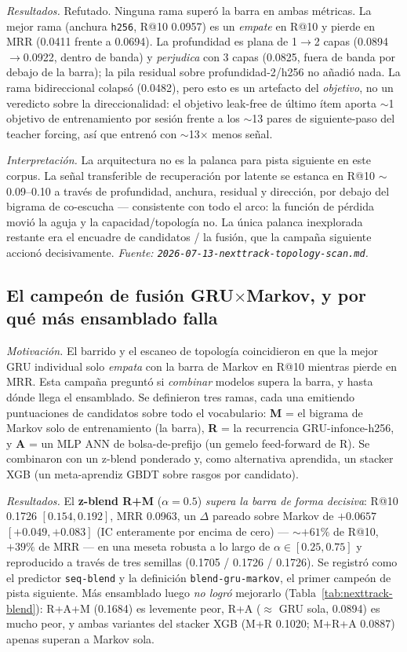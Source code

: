 \documentclass[11pt]{article}
\begin{document}
\emph{Resultados.} Refutado. Ninguna rama superó la barra en ambas métricas. La
mejor rama (anchura \texttt{h256}, R@10 \num{0.0957}) es un \emph{empate} en R@10 y
pierde en MRR (\num{0.0411} frente a \num{0.0694}). La profundidad es plana de
1$\to$2 capas (\num{0.0894}$\to$\num{0.0922}, dentro de banda) y \emph{perjudica}
con 3 capas (\num{0.0825}, fuera de banda por debajo de la barra); la pila residual
sobre profundidad-2/h256 no añadió nada. La rama bidireccional colapsó
(\num{0.0482}), pero esto es un artefacto del \emph{objetivo}, no un veredicto
sobre la direccionalidad: el objetivo leak-free de último ítem aporta $\sim$1
objetivo de entrenamiento por sesión frente a los $\sim$13 pares de siguiente-paso
del teacher forcing, así que entrenó con $\sim$13$\times$ menos señal.

\emph{Interpretación.} La arquitectura no es la palanca para pista siguiente en
este corpus. La señal transferible de recuperación por latente se estanca en R@10
$\sim$0.09--0.10 a través de profundidad, anchura, residual y dirección, por debajo
del bigrama de co-escucha --- consistente con todo el arco: la función de pérdida
movió la aguja y la capacidad/topología no. La única palanca inexplorada restante
era el encuadre de candidatos / la fusión, que la campaña siguiente accionó
decisivamente.
\emph{Fuente: \texttt{2026-07-13-nexttrack-topology-scan.md}.}

\subsection{El campeón de fusión GRU$\times$Markov, y por qué más ensamblado falla}
\label{sec:nexttrack-blend}
\emph{Motivación.} El barrido y el escaneo de topología coincidieron en que la
mejor GRU individual solo \emph{empata} con la barra de Markov en R@10 mientras
pierde en MRR. Esta campaña preguntó si \emph{combinar} modelos supera la barra, y
hasta dónde llega el ensamblado. Se definieron tres ramas, cada una emitiendo
puntuaciones de candidatos sobre todo el vocabulario: \textbf{M} = el bigrama de
Markov solo de entrenamiento (la barra), \textbf{R} = la recurrencia
GRU-infonce-h256, y \textbf{A} = un MLP ANN de bolsa-de-prefijo (un gemelo
feed-forward de R). Se combinaron con un z-blend ponderado y, como alternativa
aprendida, un stacker XGB (un meta-aprendiz GBDT sobre rasgos por candidato).

\emph{Resultados.} El \textbf{z-blend R+M} ($\alpha{=}0.5$) \emph{supera la barra
de forma decisiva}: R@10 \num{0.1726} $[0.154, 0.192]$, MRR \num{0.0963}, un
$\Delta$ pareado sobre Markov de $+\num{0.0657}$ $[+0.049, +0.083]$ (IC enteramente
por encima de cero) --- $\sim$$+61\%$ de R@10, $+39\%$ de MRR --- en una meseta
robusta a lo largo de $\alpha \in [0.25, 0.75]$ y reproducido a través de tres
semillas (\num{0.1705} / \num{0.1726} / \num{0.1726}). Se registró como el
predictor \texttt{seq-blend} y la definición \texttt{blend-gru-markov}, el primer
campeón de pista siguiente. Más ensamblado luego \emph{no logró} mejorarlo
(Tabla~\ref{tab:nexttrack-blend}): R+A+M (\num{0.1684}) es levemente peor, R+A
($\approx$ GRU sola, \num{0.0894}) es mucho peor, y ambas variantes del stacker XGB
(M+R \num{0.1020}; M+R+A \num{0.0887}) apenas superan a Markov sola.
\end{document}
